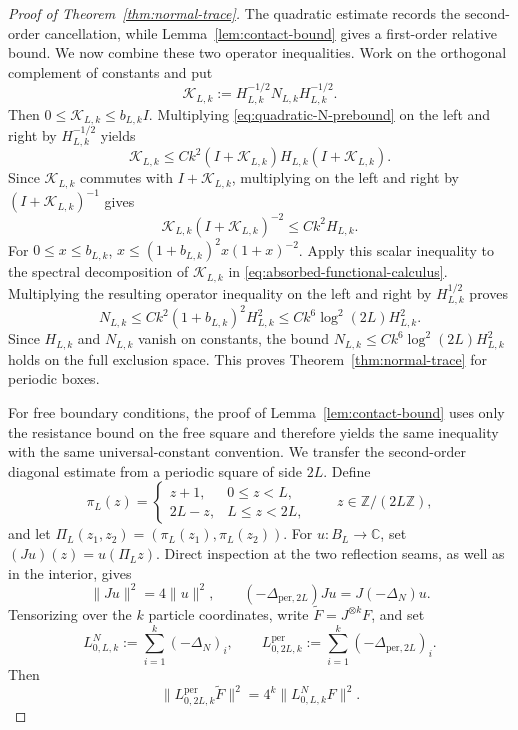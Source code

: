 \documentclass[11pt]{article}
\numberwithin{equation}{section}
\theoremstyle{remark}
\newcommand{\1}{\mathbf 1}
\begin{document}
\begin{proof}[Proof of Theorem~\ref{thm:normal-trace}]
The quadratic estimate records the second-order cancellation, while
Lemma~\ref{lem:contact-bound} gives a first-order relative bound.  We now
combine these two operator inequalities.  Work on the orthogonal complement
of constants and put
\begin{equation}
 \mathcal K_{L,k}:=H_{L,k}^{-1/2}N_{L,k}H_{L,k}^{-1/2}.
 \label{eq:relative-collision-operator}
\end{equation}
Then \(0\leq\mathcal K_{L,k}\leq b_{L,k}I\).  Multiplying
\eqref{eq:quadratic-N-prebound} on the left and right by
\(H_{L,k}^{-1/2}\) yields
\[
 \mathcal K_{L,k}
 \leq Ck^2(I+\mathcal K_{L,k})H_{L,k}(I+\mathcal K_{L,k}).
\]
Since \(\mathcal K_{L,k}\) commutes with \(I+\mathcal K_{L,k}\),
multiplying on the left and right by
\((I+\mathcal K_{L,k})^{-1}\) gives
\begin{equation}
 \mathcal K_{L,k}(I+\mathcal K_{L,k})^{-2}\leq Ck^2H_{L,k}.
 \label{eq:absorbed-functional-calculus}
\end{equation}
For \(0\leq x\leq b_{L,k}\),
\(x\leq(1+b_{L,k})^2x(1+x)^{-2}\).  Apply this scalar inequality to the
spectral decomposition of \(\mathcal K_{L,k}\) in
\eqref{eq:absorbed-functional-calculus}.
Multiplying the resulting operator inequality on the left and right by
\(H_{L,k}^{1/2}\) proves
\[
 N_{L,k}\leq Ck^2(1+b_{L,k})^2H_{L,k}^2
 \leq Ck^6\log^2(2L)H_{L,k}^2.
\]
Since \(H_{L,k}\) and \(N_{L,k}\) vanish on constants, the bound
\(N_{L,k}\leq Ck^6\log^2(2L)H_{L,k}^2\) holds on the full exclusion
space.  This proves Theorem~\ref{thm:normal-trace} for periodic boxes.

For free boundary conditions, the proof of Lemma~\ref{lem:contact-bound}
uses only the resistance bound on the free square and therefore yields the
same inequality with the same universal-constant convention.
We transfer the second-order diagonal estimate from a periodic square of
side \(2L\).  Define
\[
 \pi_L(z)=
 \begin{cases}
  z+1,&0\leq z<L,\\
  2L-z,&L\leq z<2L,
 \end{cases}
 \qquad z\in\mathbb Z/(2L\mathbb Z),
\]
and let \(\Pi_L(z_1,z_2)=(\pi_L(z_1),\pi_L(z_2))\).  For
\(u:B_L\to\mathbb C\), set \((Ju)(z)=u(\Pi_Lz)\).  Direct inspection at
the two reflection seams, as well as in the interior, gives
\begin{equation}
 \|Ju\|^2=4\|u\|^2,
 \qquad
 (-\Delta_{\mathrm{per},2L})Ju=J(-\Delta_N)u.
 \label{eq:neumann-reflection-intertwining}
\end{equation}
Tensorizing over the \(k\) particle coordinates, write
\(\widetilde F=J^{\otimes k}F\), and set
\[
 L_{0,L,k}^{N}:=\sum_{i=1}^k(-\Delta_N)_i,
 \qquad
 L_{0,2L,k}^{\mathrm{per}}
 :=\sum_{i=1}^k(-\Delta_{\mathrm{per},2L})_i.
\]
Then
\begin{equation}
 \|L_{0,2L,k}^{\mathrm{per}}\widetilde F\|^2
 =4^k\|L_{0,L,k}^{N}F\|^2.
 \label{eq:reflected-product-L2}
\end{equation}


\end{proof}
\end{document}
